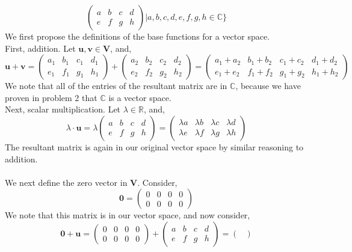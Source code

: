 \documentclass[letterpaper,10pt]{article}
\newcommand{\C}{\mathbb{C}}
\newcommand{\R}{\mathbb{R}}
\newcommand{\vect}[1]{\boldsymbol{#1}}
\begin{document}
\begin{description}
\begin{enumerate}
\[\begin{pmatrix}
a & b & c & d \\
e & f & g & h
\end{pmatrix}\bigg|a,b,c,d,e,f,g,h\in\C\bigg\}\]
We first propose the definitions of the base functions for a vector space.\\
First, addition. Let $\vect{u},\vect{v}\in\vect{V}$, and,
\[\vect{u}+\vect{v}=\begin{pmatrix}
a_1 & b_1 & c_1 & d_1 \\
e_1 & f_1 & g_1 & h_1
\end{pmatrix}+\begin{pmatrix}
a_2 & b_2 & c_2 & d_2 \\
e_2 & f_2 & g_2 & h_2
\end{pmatrix}=\begin{pmatrix}
a_1+a_2 & b_1+b_2 & c_1+c_2 & d_1+d_2 \\
e_1+e_2 & f_1+f_2 & g_1+g_2 & h_1+h_2
\end{pmatrix}\]
We note that all of the entries of the resultant matrix are in $\C$, because we have proven in problem 2 that $\C$ is a vector space.\\
Next, scalar multiplication. Let $\lambda\in\R$, and,
\[\lambda\cdot\vect{u}=\lambda\begin{pmatrix}
a & b & c & d \\
e & f & g & h
\end{pmatrix}=\begin{pmatrix}
\lambda a & \lambda b & \lambda c & \lambda d \\
\lambda e & \lambda f & \lambda g & \lambda h
\end{pmatrix}\]
The resultant matrix is again in our original vector space by similar reasoning to addition.\\\\
We next define the zero vector in $\vect{V}$. Consider,
\[\vect{0}=\begin{pmatrix}
0 & 0 & 0 & 0 \\
0 & 0 & 0 & 0
\end{pmatrix}\]
We note that this matrix is in our vector space, and now consider,
\[\vect{0}+\vect{u}=\begin{pmatrix}
0 & 0 & 0 & 0 \\
0 & 0 & 0 & 0
\end{pmatrix}+\begin{pmatrix}
a & b & c & d \\
e & f & g & h
\end{pmatrix}=\begin{pmatrix}

\end{pmatrix}\]
\end{enumerate}
\end{description}
\end{document}
